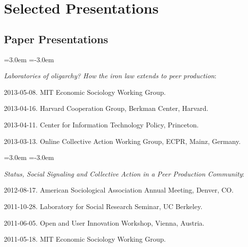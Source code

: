 \documentclass[10pt]{article}
\newenvironment{cvlist}{
\begin{list}{}{\leftmargin=3.0em \itemindent=-3.0em}
  \setlength{\itemsep}{0pt}
  \setlength{\parskip}{0em}
  \setlength{\parsep}{1em}
  \setlength{\parindent}{0em}}
{\vspace{1em}
\end{list}}
\begin{document}

\section{Selected Presentations}

\subsection{Paper Presentations}

\begin{cvlist}
\item \emph{Laboratories of oligarchy? How the iron law extends to peer production}:
\item 2013-05-08. MIT Economic Sociology Working Group.
\item 2013-04-16. Harvard Cooperation Group, Berkman Center, Harvard.
\item 2013-04-11. Center for Information Technology Policy, Princeton.
\item 2013-03-13. Online Collective Action Working Group, ECPR, Mainz, Germany.
\end{cvlist}

\begin{cvlist}
\item \emph{Status, Social Signaling and Collective Action in a Peer Production Community}:
\item 2012-08-17. American Sociological Association Annual Meeting, Denver, CO.
\item 2011-10-28. Laboratory for Social Research Seminar, UC Berkeley.
\item 2011-06-05. Open and User Innovation Workshop, Vienna, Austria.
\item 2011-05-18. MIT Economic Sociology Working Group.
\end{cvlist}
\end{document}
